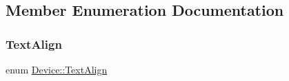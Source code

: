 \subsection{Member Enumeration Documentation}
\mbox{\label{classDevice_a62f8577d4803c8fce764f7cdff2abe92}} 
\subsubsection{\texorpdfstring{Text\+Align}{TextAlign}\hspace{0.1cm}{\footnotesize\ttfamily [1/2]}}
{\footnotesize\ttfamily enum \hyperlink{classDevice_a62f8577d4803c8fce764f7cdff2abe92}{Device\+::\+Text\+Align}\hspace{0.3cm}{\ttfamily [strong]}}

